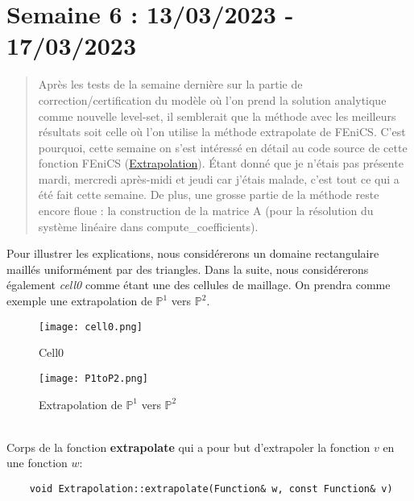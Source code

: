 \section{Semaine 6 : 13/03/2023 - 17/03/2023}
\graphicspath{{semaines/semaine_6/images/}}


\begin{abstract}
	Après les tests de la semaine dernière sur la partie de correction/certification du modèle où l'on prend la solution analytique comme nouvelle level-set, il semblerait que la méthode avec les meilleurs résultats soit celle où l'on utilise la méthode extrapolate de FEniCS. C'est pourquoi, cette semaine on s'est intéressé en détail au code source de cette fonction FEniCS (\href{https://fenics.readthedocs.io/projects/dolfin/en/2017.2.0/apis/api_adaptivity.html#extrapolation}{Extrapolation}). Étant donné que je n'étais pas présente mardi, mercredi après-midi et jeudi car j'étais malade, c'est tout ce qui a été fait cette semaine. De plus, une grosse partie de la méthode reste encore floue : la construction de la matrice A (pour la résolution du système linéaire dans compute\_coefficients).
\end{abstract}

Pour illustrer les explications, nous considérerons un domaine rectangulaire maillés uniformément par des triangles. Dans la suite, nous considérerons également \textit{cell0} comme étant une des cellules de maillage. On prendra comme exemple une extrapolation de $\mathbb{P}^1$ vers $\mathbb{P}^2$. 

\begin{minipage}{0.48\linewidth}
	\begin{figure}[H]
		\centering
		\texttt{[image: cell0.png]}
		\caption{Cell0}
	\end{figure}
\end{minipage}
\begin{minipage}{0.48\linewidth}
	\begin{figure}[H]
		\centering
		\texttt{[image: P1toP2.png]}
		\caption{Extrapolation de $\mathbb{P}^1$ vers $\mathbb{P}^2$}
	\end{figure}
\end{minipage} \; \\


Corps de la fonction \textbf{extrapolate} qui a pour but d'extrapoler la fonction $v$ en une fonction $w$:

\begin{lstlisting}
	void Extrapolation::extrapolate(Function& w, const Function& v)
\end{lstlisting}

